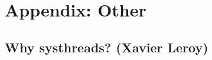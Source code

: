 \documentclass[a4paper,12pt]{article}
\begin{document}
\newpage
\section{Appendix: Other}
\subsection{Why systhreads? (Xavier Leroy)}
\label{appendixSysthreads}
{\tt
  \scriptsize
  
  \normalsize
}
\end{document}

